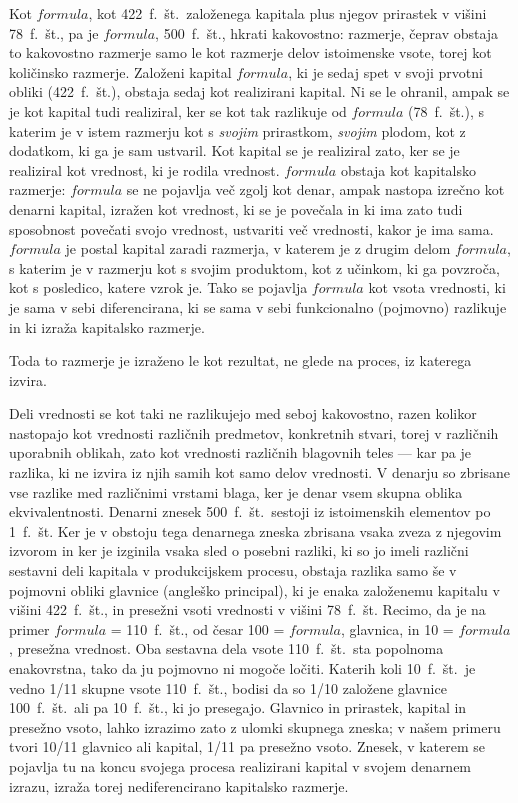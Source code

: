 \documentclass[kapital_02.tex]{subfiles}
\begin{document}
Kot \( formula \), kot 422~f.~št.\ založenega kapitala plus njegov prirastek v višini 78~f.~št., pa je \( formula \), 500~f.~št., hkrati kakovostno: razmerje, čeprav obstaja to kakovostno razmerje samo le kot razmerje delov istoimenske vsote, torej kot količinsko razmerje. Založeni kapital \( formula \), ki je sedaj spet v svoji prvotni obliki (422~f.~št.), obstaja sedaj kot realizirani kapital. Ni se le ohranil, ampak se je kot kapital tudi realiziral, ker se kot tak razlikuje od \( formula \) (78~f.~št.), s katerim je v istem razmerju kot s \emph{svojim} prirastkom, \emph{svojim} plodom, kot z dodatkom, ki ga je sam ustvaril. Kot kapital se je realiziral zato, ker se je realiziral kot vrednost, ki je rodila vrednost. \( formula \) obstaja kot kapitalsko razmerje: \( formula \) se ne pojavlja več zgolj kot denar, ampak nastopa izrečno kot denarni kapital, izražen kot vrednost, ki se je povečala in ki ima zato tudi sposobnost povečati svojo vrednost, ustvariti več vrednosti, kakor je ima sama. \( formula \) je postal kapital zaradi razmerja, v katerem je z drugim delom \( formula \), s katerim je v razmerju kot s svojim produktom, kot z učinkom, ki ga povzroča, kot s posledico, katere vzrok je. Tako se pojavlja \( formula \) kot vsota vrednosti, ki je sama v sebi diferencirana, ki se sama v sebi funkcionalno (pojmovno) razlikuje in ki izraža kapitalsko razmerje.

Toda to razmerje je izraženo le kot rezultat, ne glede na proces, iz katerega izvira.

Deli vrednosti se kot taki ne razlikujejo med seboj kakovostno, razen kolikor nastopajo kot vrednosti različnih predmetov, konkretnih stvari, torej v različnih uporabnih oblikah, zato kot vrednosti različnih blagovnih teles --- kar pa je razlika, ki ne izvira iz njih samih kot samo delov vrednosti. V denarju so zbrisane vse razlike med različnimi vrstami blaga, ker je denar vsem skupna oblika ekvivalentnosti. Denarni znesek 500~f.~št.\ sestoji iz istoimenskih elementov po 1~f.~št. Ker je v obstoju tega denarnega zneska zbrisana vsaka zveza z njegovim izvorom in ker je izginila vsaka sled o posebni razliki, ki so jo imeli različni sestavni deli kapitala v produkcijskem procesu, obstaja razlika samo še v pojmovni obliki glavnice (angleško principal), ki je enaka založenemu kapitalu v višini 422~f.~št., in presežni vsoti vrednosti v višini 78~f.~št. Recimo, da je na primer \( formula \) = 110~f.~št., od česar 100 = \( formula \), glavnica, in 10 = \( formula \), presežna vrednost. Oba sestavna dela vsote 110~f.~št.\ sta popolnoma enakovrstna, tako da ju pojmovno ni mogoče ločiti. Katerih koli 10~f.~št.\ je vedno 1/11 skupne vsote 110~f.~št., bodisi da so 1/10 založene glavnice 100~f.~št.\ ali pa 10~f.~št., ki jo presegajo. Glavnico in prirastek, kapital in presežno vsoto, lahko izrazimo zato z ulomki skupnega zneska; v našem primeru tvori 10/11 glavnico ali kapital, 1/11 pa presežno vsoto. Znesek, v katerem se pojavlja tu na koncu svojega procesa realizirani kapital v svojem denarnem izrazu, izraža torej nediferencirano kapitalsko razmerje.
\end{document}
